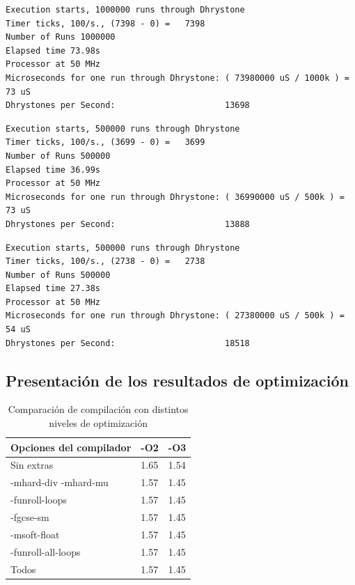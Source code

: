 \begin{lstlisting}[frame=single,caption={Optimización nivel -O2},label={lst:salidas},breaklines]
Execution starts, 1000000 runs through Dhrystone
Timer ticks, 100/s., (7398 - 0) =	7398
Number of Runs 1000000
Elapsed time 73.98s
Processor at 50 MHz
Microseconds for one run through Dhrystone: ( 73980000 uS / 1000k ) = 73 uS
Dhrystones per Second:                      13698 
\end{lstlisting}

\begin{lstlisting}[frame=single,caption={Optimización nivel -O2},label={lst:salidas},breaklines]
Execution starts, 500000 runs through Dhrystone
Timer ticks, 100/s., (3699 - 0) =	3699
Number of Runs 500000
Elapsed time 36.99s
Processor at 50 MHz
Microseconds for one run through Dhrystone: ( 36990000 uS / 500k ) = 73 uS
Dhrystones per Second:                      13888 
\end{lstlisting}

\begin{lstlisting}[frame=single,caption={Optimización nivel -O3},label={lst:salidas},breaklines]
Execution starts, 500000 runs through Dhrystone
Timer ticks, 100/s., (2738 - 0) =	2738
Number of Runs 500000
Elapsed time 27.38s
Processor at 50 MHz
Microseconds for one run through Dhrystone: ( 27380000 uS / 500k ) = 54 uS
Dhrystones per Second:                      18518 
\end{lstlisting}


	\subsection {Presentación de los resultados de optimización} 

\begin{table}[h!]
\begin{center}
\begin{tabular}{ |l |l| l|}
\hline
\rowcolor[gray]{0.8} Opciones del compilador&-O2&-O3 \\
\hline
Sin extras 					&1.65 			&1.54\\
\hline
-mhard-div -mhard-mu 		& 1.57			&1.45 \\
\hline
-funroll-loops			 	& 1.57			& 1.45 \\
\hline
-fgcse-sm					& 1.57			& 1.45 \\
\hline
-msoft-float 				& 1.57			&1.45  \\
\hline
-funroll-all-loops	 		& 1.57			& 1.45 \\
\hline
Todos	 					& 1.57			& 1.45 \\
\hline
\end{tabular}
\end{center}
\caption{Comparación de compilación con distintos niveles de optimización}
\end{table}

